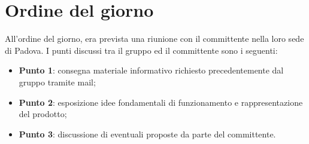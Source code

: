 \section{Ordine del giorno}
All'ordine del giorno, era prevista una riunione  con il committente nella loro sede di Padova. 
I punti discussi tra il gruppo ed il committente sono i seguenti: 
\begin{itemize}
	\item \textbf{Punto 1}: consegna materiale informativo richiesto precedentemente dal gruppo tramite mail; 
	\item \textbf{Punto 2}: esposizione idee fondamentali di funzionamento e rappresentazione del prodotto; 
	\item \textbf{Punto 3}: discussione di eventuali proposte da parte del committente.
\end{itemize}